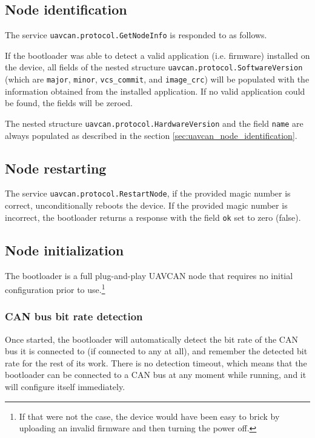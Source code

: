 \documentclass{zubaxdoc}
\begin{document}
\subsection{Node identification}\label{sec:bootloader_uavcan_node_identification}

The service \verb|uavcan.protocol.GetNodeInfo| is responded to as follows.

If the bootloader was able to detect a valid application (i.e. firmware) installed on the device,
all fields of the nested structure \verb|uavcan.protocol.SoftwareVersion|
(which are \verb|major|, \verb|minor|, \verb|vcs_commit|, and \verb|image_crc|)
will be populated with the information obtained from the installed application.
If no valid application could be found, the fields will be zeroed.

The nested structure \verb|uavcan.protocol.HardwareVersion| and the field \verb|name|
are always populated as described in the section \ref{sec:uavcan_node_identification}.

\subsection{Node restarting}\label{sec:bootloader_uavcan_node_restarting}

The service \verb|uavcan.protocol.RestartNode|, if the provided magic number is correct,
unconditionally reboots the device.
If the provided magic number is incorrect, the bootloader returns a response with the field \verb|ok|
set to zero (false).

\subsection{Node initialization}

The bootloader is a full plug-and-play UAVCAN node that requires no initial configuration prior to
use.\footnote{If that were not the case, the device would have been easy to brick
by uploading an invalid firmware and then turning the power off.}

\subsubsection{CAN bus bit rate detection}

Once started, the bootloader will automatically detect the bit rate of the CAN bus it is connected to
(if connected to any at all), and remember the detected bit rate for the rest of its work.
There is no detection timeout, which means that the bootloader can be connected to a CAN bus at
any moment while running, and it will configure itself immediately.
\end{document}
